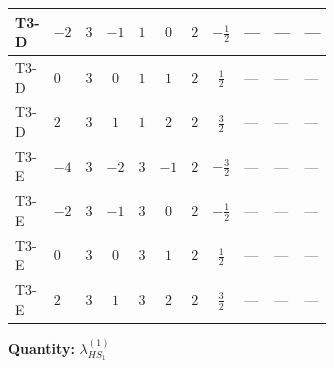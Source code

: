 \documentclass[8pt]{article}
\begin{document}
\begin{landscape}
\begin{longtable}{@{}llcccccc >{\raggedright\arraybackslash}p{0.21\linewidth} >{\raggedright\arraybackslash}p{0.21\linewidth} >{\raggedright\arraybackslash}p{0.21\linewidth}@{}}
\midrule
T3-D & $-2$ & $3$ & $-1$ & $1$ & $0$ & $2$ & $-\frac{1}{2}$ & --- & --- & --- \\
\midrule
T3-D & $0$ & $3$ & $0$ & $1$ & $1$ & $2$ & $\frac{1}{2}$ & --- & --- & --- \\
\midrule
T3-D & $2$ & $3$ & $1$ & $1$ & $2$ & $2$ & $\frac{3}{2}$ & --- & --- & --- \\
\midrule
T3-E & $-4$ & $3$ & $-2$ & $3$ & $-1$ & $2$ & $-\frac{3}{2}$ & --- & --- & --- \\
\midrule
T3-E & $-2$ & $3$ & $-1$ & $3$ & $0$ & $2$ & $-\frac{1}{2}$ & --- & --- & --- \\
\midrule
T3-E & $0$ & $3$ & $0$ & $3$ & $1$ & $2$ & $\frac{1}{2}$ & --- & --- & --- \\
\midrule
T3-E & $2$ & $3$ & $1$ & $3$ & $2$ & $2$ & $\frac{3}{2}$ & --- & --- & --- \\
\midrule
\bottomrule
\end{longtable}
\clearpage
\noindent\textbf{Quantity: }$\lambda_{HS_1}^{(1)}$\par\smallskip

\end{landscape}
\end{document}
